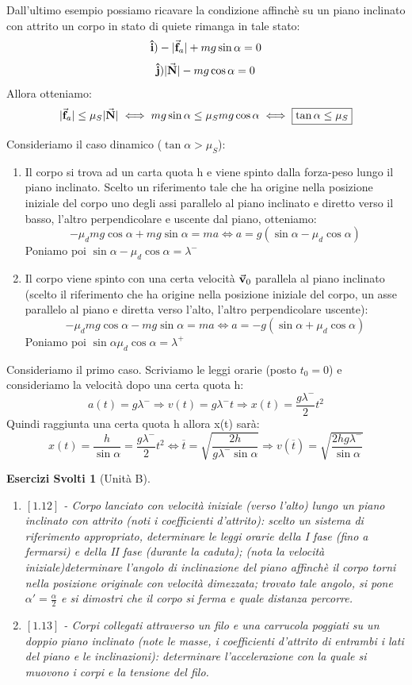 \documentclass{article}
\newtheorem{exerc}[example]{Esercizi Svolti}
\newcommand{\then}{\ensuremath{\Rightarrow}}
\renewcommand{\i}{\vu{i}}
\renewcommand{\j}{\vu{j}}
\renewcommand{\v}{\va{v}}
\newcommand{\N}{\va{N}}
\newcommand{\f}{\va{f}}
\begin{document}
Dall'ultimo esempio possiamo ricavare la condizione affinchè su un piano inclinato con attrito un corpo in stato di quiete rimanga in tale stato:
\[\i) -|\f_a|+mg\sin\alpha=0\]
\[\j) |\N|-mg\cos\alpha=0\]
Allora otteniamo:
\[|\f_a|\leq \mu_S|\N|\iff mg\sin\alpha\leq \mu_Smg\cos\alpha\iff \boxed{\tan\alpha\leq \mu_S}\]

Consideriamo il caso dinamico ($\tan\alpha>\mu_S$):
\begin{enumerate}
    \item Il corpo si trova ad un carta quota h e viene spinto dalla forza-peso lungo il piano inclinato. Scelto un riferimento tale che ha origine nella posizione iniziale del corpo uno degli assi parallelo al piano inclinato e diretto verso il basso, l'altro perpendicolare e uscente dal piano, otteniamo:
    \[-\mu_dmg\cos\alpha+mg\sin\alpha=ma\iff a=g(\sin\alpha-\mu_d\cos\alpha) \]
    Poniamo poi \(\sin\alpha-\mu_d\cos\alpha=\lambda^-\)
    \item Il corpo viene spinto con una certa velocità $\v_0$ parallela al piano inclinato (scelto il riferimento che ha origine nella posizione iniziale del corpo, un asse parallelo al piano e diretta verso l'alto, l'altro perpendicolare uscente):
    \[-\mu_dmg\cos\alpha-mg\sin\alpha=ma\iff a=-g(\sin\alpha+\mu_d\cos\alpha) \]
    Poniamo poi \(\sin\alpha\mu_d\cos\alpha=\lambda^+\)
\end{enumerate}
Consideriamo il primo caso. Scriviamo le leggi orarie (posto $t_0=0$) e consideriamo la velocità dopo una certa quota h:
\[a(t)=g\lambda^-\then v(t)=g\lambda^-t\then x(t)=\frac{g\lambda^-}{2}t^2\]
Quindi raggiunta una certa quota h allora x(t) sarà:
\[x(t)=\frac{h}{\sin\alpha}=\frac{g\lambda^-}{2}t^2\iff \overline{t}=\sqrt{\frac{2h}{g\lambda^-\sin\alpha}}\then \boxed{v(\overline{t})=\sqrt{\frac{2hg\lambda^-}{\sin\alpha}}}\]

\begin{exerc}[Unità B]
\begin{enumerate}
    \item \(\left[1.12\right]\) - Corpo lanciato con velocità iniziale (verso l'alto) lungo un piano inclinato con attrito (noti i coefficienti d'attrito): scelto un sistema di riferimento appropriato, determinare le leggi orarie della I fase (fino a fermarsi) e della II fase (durante la caduta); (nota la velocità iniziale)determinare l'angolo di inclinazione del piano affinchè il corpo torni nella posizione originale con velocità dimezzata; trovato tale angolo, si pone $\alpha'=\frac{\alpha}{2}$ e si dimostri che il corpo si ferma e quale distanza percorre.
    \item \(\left[1.13\right]\) - Corpi collegati attraverso un filo e una carrucola poggiati su un doppio piano inclinato (note le masse, i coefficienti d'attrito di entrambi i lati del piano e le inclinazioni): determinare l'accelerazione con la quale si muovono i corpi e la tensione del filo.
\end{enumerate}
\end{exerc}
\end{document}
